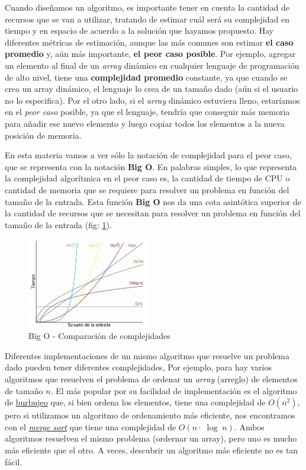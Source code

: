 Cuando diseñamos un algoritmo, es importante tener en cuenta la cantidad de recursos que se van a utilizar, tratando de
estimar cuál será su complejidad en tiempo y en espacio de acuerdo a la solución que hayamos propuesto. Hay diferentes
métricas de estimación, aunque las más comunes son estimar \textbf{el caso promedio} y, aún más importante, \textbf{el
peor caso posible}. Por ejemplo, agregar un elemento al final de un \textit{array} dinámico en cualquier lenguaje de
programación de alto nivel, tiene una \textbf{complejidad promedio} constante, ya que cuando se crea un array dinámico,
el lenguaje lo crea de un tamaño dado (aún si el usuario no lo especifica). Por el otro lado, si el \textit{array}
dinámico estuviera lleno, estaríamos en el \textit{peor caso} posible, ya que el lenguaje, tendría que conseguir más
memoria para añadir ese nuevo elemento y luego copiar todos los elementos a la nueva posición de memoria.

En esta materia vamos a ver sólo la notación de complejidad para el peor caso, que se representa con la notación
\textbf{Big O}. En palabras simples, lo que representa la complejidad algorítmica en el peor caso es, la cantidad de
tiempo de CPU o cantidad de memoria que se requiere para resolver un problema en función del tamaño de la entrada. Esta
función \textbf{Big O} nos da una cota asintótica superior de la cantidad de recursos que se necesitan para resolver un
problema en función del tamaño de la entrada (fig: \ref{fig:big_o_comparison}).

\begin{figure}[H]
  \centering
  \includegraphics[width=200px]{./images/big_o_comparison.png}
  \caption{Big O - Comparación de complejidades}
  \label{fig:big_o_comparison}
\end{figure}

Diferentes implementaciones de un mismo algoritmo que resuelve un problema dado pueden tener diferentes complejidades,
Por ejemplo, para hay varios algoritmos que resuelven el problema de ordenar un \textit{array} (arreglo) de elementos de
tamaño $n$. El más popular por su facilidad de implementación es el algoritmo de
\href{https://es.wikipedia.org/wiki/Ordenamiento_de_burbuja}{burbujeo} que, si bien ordena los elementos, tiene una
complejidad de $O(n^2)$, pero si utilizamos un algoritmo de ordenamiento más eficiente, nos encontramos con el
\href{https://es.wikipedia.org/wiki/Ordenamiento_por_mezcla}{\textit{merge sort}} que tiene una complejidad de $O(n
\cdot \; \log \; n)$. Ambos algoritmos resuelven el mismo problema (ordernar un array), pero uno es mucho más eficiente
que el otro. A veces, descubrir un algoritmo más eficiente no es tan fácil.

